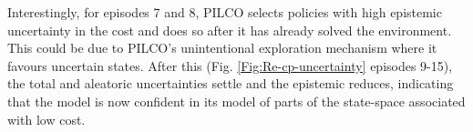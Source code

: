 Interestingly, for episodes 7 and 8, PILCO selects policies with high epistemic uncertainty in the cost and does so after it has already solved the environment. This could be due to PILCO's unintentional exploration mechanism where it favours uncertain states. After this (Fig. \ref{Fig:Re-cp-uncertainty} episodes 9-15), the total and aleatoric uncertainties settle and the epistemic reduces, indicating that the model is now confident in its model of parts of the state-space associated with low cost.







